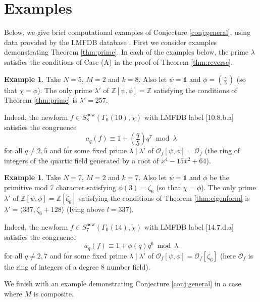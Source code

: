 \documentclass{amsart}
\theoremstyle{plain}
\theoremstyle{definition}
\newtheorem{eg}[theorem]{Example}
\begin{document}
\section{Examples}
\label{section:eg}


Below, we give brief computational examples of Conjecture \ref{conj:general}, using data provided by the LMFDB database \cite{lmfdb}. First we consider examples demonstrating Theorem \ref{thm:prime}. In each of the examples below, the prime $\lambda$ satisfies the conditions of Case (A) in the proof of Theorem \ref{thm:reverse}.

\begin{eg}
Take $N=5$, $M=2$ and $k=8$. Also let $\psi = \mathds{1}$ and $\phi = \left(\frac{\cdot}{5}\right)$ (so that $\chi = \phi$). The only prime $\lambda'$ of $\mathbb{Z}[\psi,\phi] = \mathbb{Z}$ satisfying the conditions of Theorem \ref{thm:prime} is $\lambda' = 257$. 

\noindent Indeed, the newform $f \in S_8^{\text{new}}(\Gamma_0(10), \tilde{\chi})$ with LMFDB label [10.8.b.a] satisfies the congruence \[a_q(f) \equiv 1+\left(\frac{q}{5}\right)q^{7} \bmod \lambda\] for all $q\neq 2,5$ and for some fixed prime $\lambda\mid \lambda'$ of $\mathcal{O}_f[\psi, \phi] = \mathcal{O}_f$ (the ring of integers of the quartic field generated by a root of $x^4-15x^2+64$).
\end{eg}

\begin{eg}
Take $N=7$, $M=2$ and $k=7$. Also let $\psi = \mathds{1}$ and $\phi$ be the primitive mod $7$ character satisfying $\phi(3) = \zeta_6$ (so that $\chi = \phi$). The only prime $\lambda'$ of $\mathbb{Z}[\psi,\phi] = \mathbb{Z}[\zeta_6]$ satisfying the conditions of Theorem \ref{thm:eigenform} is $\lambda' = \langle 337, \zeta_6+128\rangle$ (lying above $l = 337$). 

\noindent Indeed, the newform $f \in S_7^{\text{new}}(\Gamma_0(14), \tilde{\chi})$ with LMFDB label [14.7.d.a] satisfies the congruence \[a_q(f) \equiv 1 + \phi(q)q^6 \bmod \lambda\] for all $q\neq 2,7$ and for some fixed prime $\lambda\mid \lambda'$ of $\mathcal{O}_f[\psi,\phi] = \mathcal{O}_f[\zeta_6]$ (here $\mathcal{O}_f$ is the ring of integers of a degree $8$ number field).
\end{eg}

We finish with an example demonstrating Conjecture \ref{conj:general} in a case where $M$ is composite.
\end{document}
